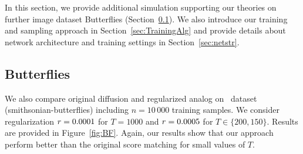 In this section, we provide additional simulation supporting our theories on further image dataset Butterflies (Section~\ref{sec:BF}).
We also  introduce our training and sampling approach in Section~\ref{sec:TrainingAlg} and provide details about network architecture and training settings in Section~\ref{sec:netstr}. 
\subsection{Butterflies}\label{sec:BF}
We also compare original diffusion and  regularized analog on \ButF~dataset (smithsonian-butterflies) including $n=10\,000$ training samples.
We consider regularization $\textcolor{black}{r}=0.0001$ for $T=1000$ and $\textcolor{black}{r}=0.0005$ for $T\in \{200,150\}$.
Results are provided in Figure~\ref{fig:BF}. 
Again, our results show that our approach perform better than the original score matching  for small values of $T$. 

